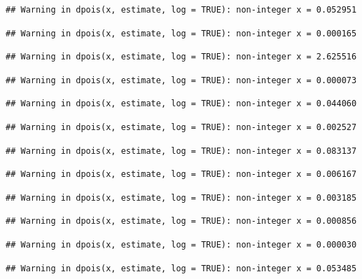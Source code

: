 \documentclass[]{article}
\begin{document}
\begin{verbatim}
## Warning in dpois(x, estimate, log = TRUE): non-integer x = 0.052951
\end{verbatim}

\begin{verbatim}
## Warning in dpois(x, estimate, log = TRUE): non-integer x = 0.000165
\end{verbatim}

\begin{verbatim}
## Warning in dpois(x, estimate, log = TRUE): non-integer x = 2.625516
\end{verbatim}

\begin{verbatim}
## Warning in dpois(x, estimate, log = TRUE): non-integer x = 0.000073
\end{verbatim}

\begin{verbatim}
## Warning in dpois(x, estimate, log = TRUE): non-integer x = 0.044060
\end{verbatim}

\begin{verbatim}
## Warning in dpois(x, estimate, log = TRUE): non-integer x = 0.002527
\end{verbatim}

\begin{verbatim}
## Warning in dpois(x, estimate, log = TRUE): non-integer x = 0.083137
\end{verbatim}

\begin{verbatim}
## Warning in dpois(x, estimate, log = TRUE): non-integer x = 0.006167
\end{verbatim}

\begin{verbatim}
## Warning in dpois(x, estimate, log = TRUE): non-integer x = 0.003185
\end{verbatim}

\begin{verbatim}
## Warning in dpois(x, estimate, log = TRUE): non-integer x = 0.000856
\end{verbatim}

\begin{verbatim}
## Warning in dpois(x, estimate, log = TRUE): non-integer x = 0.000030
\end{verbatim}

\begin{verbatim}
## Warning in dpois(x, estimate, log = TRUE): non-integer x = 0.053485
\end{verbatim}
\end{document}
